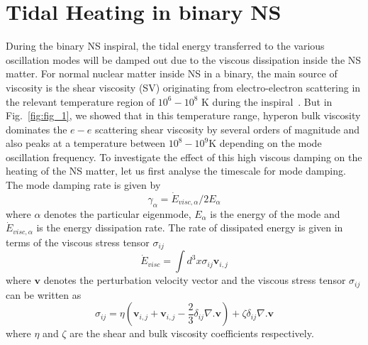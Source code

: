 \documentclass[%
 reprint,
 amsmath,amssymb,
 aps,
]{revtex4-2}
\begin{document}
\section{Tidal Heating in binary NS}
During the binary NS inspiral, the tidal energy transferred to the various oscillation modes will be damped out due to the viscous dissipation inside the NS matter. For normal nuclear matter inside NS in a binary, the main source of viscosity is the shear viscosity (SV) originating from electro-electron scattering in the relevant temperature region of $10^6 - 10^8$ K during the inspiral~\cite{Arras2019}. But in Fig.~\ref{fig:fig_1}, we showed that in this temperature range, hyperon bulk viscosity dominates the $e-e$ scattering shear viscosity by several orders of magnitude and also peaks at a temperature between $10^8 - 10^9$K depending on the mode oscillation frequency. To investigate the effect of this high viscous damping on the heating of the NS matter, let us first analyse the timescale for mode damping. The mode damping rate is given by
\begin{equation}\label{eq:damptime2}
    \gamma_{\alpha} = \Dot{E}_{visc,\alpha}/2E_{\alpha}
\end{equation}
where $\alpha$ denotes the particular eigenmode, $E_{\alpha}$ is the energy of the mode and $\Dot{E}_{visc,\alpha}$ is the energy dissipation rate. The rate of dissipated energy is given in terms of the viscous stress tensor $\sigma_{ij}$~\cite{Lai_1994}
\begin{equation}\label{eq:viscenergy}
    \Dot{E}_{visc} = \int d^3x \sigma_{ij}\bm{v}_{i,j}
\end{equation}
where $\bm{v}$ denotes the perturbation velocity vector and the viscous stress tensor $\sigma_{ij}$ can be written as~\cite{Landau1987Fluid}
\begin{equation}\label{eq:visctensor}
    \sigma_{ij} = \eta\left(\bm{v}_{i,j} + \bm{v}_{i,j} - \frac{2}{3}\delta_{ij}\nabla .\bm{v}\right) + \zeta\delta_{ij}\nabla . \bm{v}
\end{equation}
where $\eta$ and $\zeta$ are the shear and bulk viscosity coefficients respectively. \\
\end{document}
